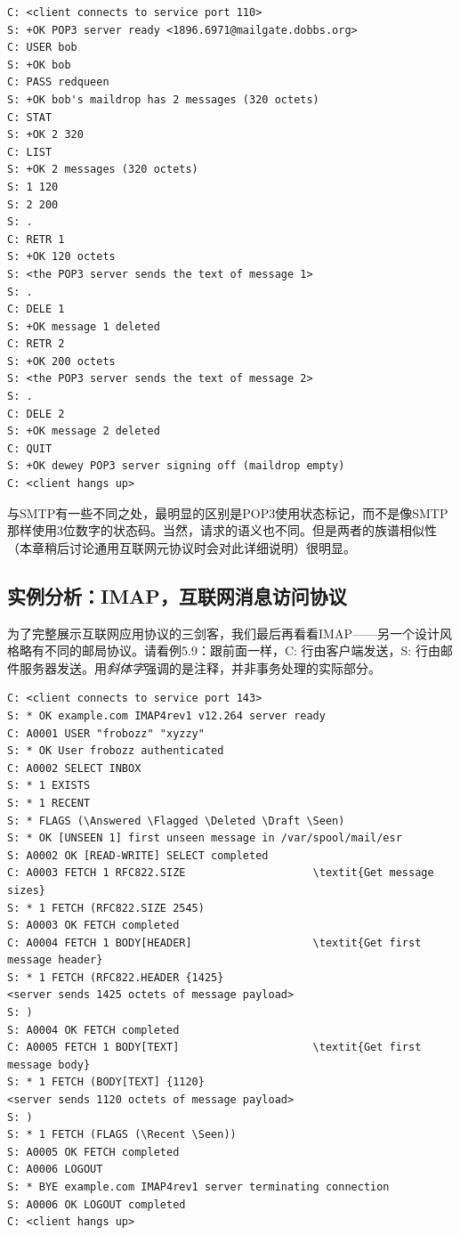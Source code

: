 \documentclass[12pt,oneside]{book}
\begin{document}
\begin{Verbatim}[label=例5.8 POP3会话实例]
C: <client connects to service port 110> 
S: +OK POP3 server ready <1896.6971@mailgate.dobbs.org>
C: USER bob
S: +OK bob
C: PASS redqueen
S: +OK bob's maildrop has 2 messages (320 octets)
C: STAT
S: +OK 2 320
C: LIST
S: +OK 2 messages (320 octets)
S: 1 120
S: 2 200
S: .
C: RETR 1
S: +OK 120 octets
S: <the POP3 server sends the text of message 1>
S: .
C: DELE 1
S: +OK message 1 deleted
C: RETR 2
S: +OK 200 octets
S: <the POP3 server sends the text of message 2>
S: .
C: DELE 2
S: +OK message 2 deleted
C: QUIT
S: +OK dewey POP3 server signing off (maildrop empty)
C: <client hangs up>
\end{Verbatim}

与SMTP有一些不同之处，最明显的区别是POP3使用状态标记，而不是像SMTP那样使用3位数字的状态码。当然，请求的语义也不同。但是两者的族谱相似性（本章稍后讨论通用互联网元协议时会对此详细说明）很明显。


\subsection{实例分析：IMAP，互联网消息访问协议}
为了完整展示互联网应用协议的三剑客，我们最后再看看IMAP——另一个设计风格略有不同的邮局协议。请看例5.9：跟前面一样，C: 行由客户端发送，S: 行由邮件服务器发送。用\textit{斜体字}强调的是注释，并非事务处理的实际部分。

\begin{Verbatim}[label=例5.9 IMAP会话实例]
C: <client connects to service port 143>
S: * OK example.com IMAP4rev1 v12.264 server ready
C: A0001 USER "frobozz" "xyzzy"
S: * OK User frobozz authenticated
C: A0002 SELECT INBOX
S: * 1 EXISTS
S: * 1 RECENT
S: * FLAGS (\Answered \Flagged \Deleted \Draft \Seen)
S: * OK [UNSEEN 1] first unseen message in /var/spool/mail/esr
S: A0002 OK [READ-WRITE] SELECT completed
C: A0003 FETCH 1 RFC822.SIZE                    \textit{Get message sizes}
S: * 1 FETCH (RFC822.SIZE 2545)
S: A0003 OK FETCH completed
C: A0004 FETCH 1 BODY[HEADER]                   \textit{Get first message header}
S: * 1 FETCH (RFC822.HEADER {1425}
<server sends 1425 octets of message payload>
S: )
S: A0004 OK FETCH completed
C: A0005 FETCH 1 BODY[TEXT]                     \textit{Get first message body}
S: * 1 FETCH (BODY[TEXT] {1120}
<server sends 1120 octets of message payload>
S: )
S: * 1 FETCH (FLAGS (\Recent \Seen))
S: A0005 OK FETCH completed
C: A0006 LOGOUT
S: * BYE example.com IMAP4rev1 server terminating connection
S: A0006 OK LOGOUT completed
C: <client hangs up>
\end{Verbatim}
\end{document}
